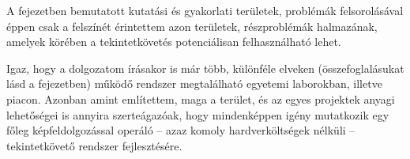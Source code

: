A fejezetben bemutatott kutatási és gyakorlati területek, problémák felsorolásával éppen csak a felszínét érintettem azon területek, részproblémák halmazának, amelyek körében a tekintetkövetés potenciálisan felhasználható lehet.

Igaz, hogy a dolgozatom írásakor is már több, különféle elveken (összefoglalásukat lásd a  fejezetben) működő rendszer megtalálható egyetemi laborokban, illetve piacon. Azonban amint említettem, maga a terület, és az egyes projektek anyagi lehetőségei is annyira szerteágazóak, hogy mindenképpen igény mutatkozik egy főleg képfeldolgozással operáló -- azaz komoly hardverköltségek nélküli -- tekintetkövető rendszer fejlesztésére.